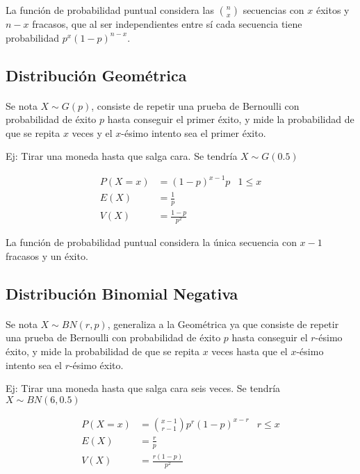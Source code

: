 \documentclass[../main.tex]{subfiles}
\begin{document}
La función de probabilidad puntual considera las \(\binom{n}{x}\) secuencias con \(x\) éxitos y \(n-x\) fracasos, que al ser independientes entre sí cada secuencia tiene probabilidad \(p^{x}(1-p)^{n-x}\).

\subsection{Distribución Geométrica}

\paragraph{} Se nota \(X \sim G(p)\), consiste de repetir una prueba de Bernoulli con probabilidad de éxito \(p\) hasta conseguir el primer éxito, y mide la probabilidad de que se repita \(x\) veces y el \(x\)-ésimo intento sea el primer éxito.

Ej: Tirar una moneda hasta que salga cara. Se tendría \(X \sim G(0.5)\)

\begin{align*}
  P(X = x) &= (1-p)^{x-1}p & 1 \leq x \\
  E(X) &= \frac{1}{p} \\
  V(X) &= \frac{1-p}{p^{2}}
\end{align*}

La función de probabilidad puntual considera la única secuencia con \(x-1\) fracasos y un éxito.

\subsection{Distribución Binomial Negativa}

\paragraph{} Se nota \(X \sim BN(r, p)\), generaliza a la Geométrica ya que consiste de repetir una prueba de Bernoulli con probabilidad de éxito \(p\) hasta conseguir el \(r\)-ésimo éxito, y mide la probabilidad de que se repita \(x\) veces hasta que el \(x\)-ésimo intento sea el \(r\)-ésimo éxito.

Ej: Tirar una moneda hasta que salga cara seis veces. Se tendría \(X \sim BN(6, 0.5)\)

\begin{align*}
  P(X = x) &= \binom{x-1}{r-1}p^{r}(1-p)^{x-r} & r \leq x \\
  E(X) &= \frac{r}{p} \\
  V(X) &= \frac{r(1-p)}{p^{2}}
\end{align*}
\end{document}
